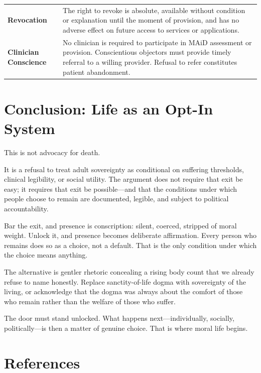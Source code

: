 \documentclass[11pt, letterpaper]{article}
\begin{document}
\begin{longtable}{>{\bfseries\sffamily\small}p{3cm} p{10.5cm}}
Revocation
  & The right to revoke is absolute, available without condition or
    explanation until the moment of provision, and has no adverse effect
    on future access to services or applications. \\[6pt]

Clinician Conscience
  & No clinician is required to participate in MAiD assessment or provision.
    Conscientious objectors must provide timely referral to a willing
    provider. Refusal to refer constitutes patient abandonment. \\

\end{longtable}

\section*{Conclusion: Life as an Opt-In System}

This is not advocacy for death.

It is a refusal to treat adult sovereignty as conditional on suffering thresholds, clinical
legibility, or social utility. The argument does not require that exit be easy; it requires
that exit be possible---and that the conditions under which people choose to remain are
documented, legible, and subject to political accountability.

Bar the exit, and presence is conscription: silent, coerced, stripped of moral weight. Unlock
it, and presence becomes deliberate affirmation. Every person who remains does so as a
choice, not a default. That is the only condition under which the choice means anything.

The alternative is gentler rhetoric concealing a rising body count that we already refuse to
name honestly. Replace sanctity-of-life dogma with sovereignty of the living, or acknowledge
that the dogma was always about the comfort of those who remain rather than the welfare of
those who suffer.

The door must stand unlocked. What happens next---individually, socially, politically---is
then a matter of genuine choice. That is where moral life begins.

\newpage

\section*{References}
\end{document}
